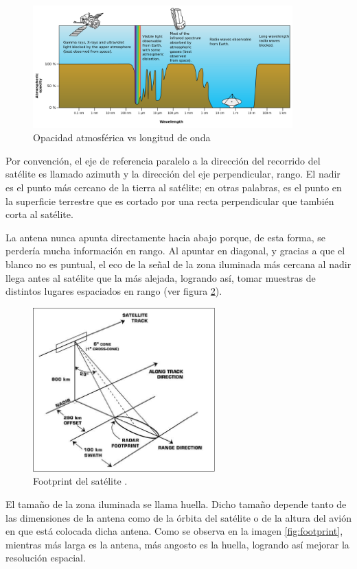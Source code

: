 \begin{figure}[H]
 \centering
 \includegraphics[width=10cm]{gfx/AtmosphericOpacity.png}
 \caption{Opacidad atmosférica vs longitud de onda \cite{electromagneticOpacity}}
 \label{fig:atmosphere}
\end{figure}

Por convención, el eje de referencia paralelo a la dirección del recorrido del satélite es llamado azimuth y la
dirección del eje perpendicular, rango. El nadir es el punto más cercano de la tierra al satélite; en otras palabras,
es el punto en la superficie terrestre que es cortado por una recta perpendicular que también corta al satélite.

La antena nunca apunta directamente hacia abajo porque, de esta forma, se perdería mucha información en rango. Al apuntar
en diagonal, y gracias a que el blanco no es puntual, el eco de la señal de la zona iluminada más cercana al nadir llega
antes al satélite que la más alejada, logrando así, tomar muestras de distintos lugares espaciados en rango (ver figura
\ref{fig:antena_ilumination}).

\begin{figure}[H]
 \centering
 \includegraphics[width=7cm]{gfx/satellite.png}
 \caption{Footprint del satélite \cite{FootprintSatellite}.}
 \label{fig:antena_ilumination}
\end{figure}

El tamaño de la zona iluminada se llama huella. Dicho tamaño depende tanto de las dimensiones de la antena como de la
órbita del satélite o de la altura del avión en que está colocada dicha antena. Como se observa en la imagen
\ref{fig:footprint}, mientras más larga es la antena, más angosto es la huella, logrando así mejorar la resolución
espacial.


